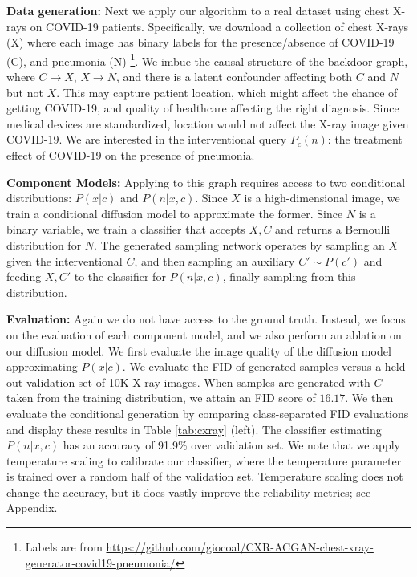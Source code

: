 \documentclass{article}
\newcommand{\idgen}{\text{ID-GEN}\xspace}
\theoremstyle{plain}
\theoremstyle{definition}
\theoremstyle{remark}
\begin{document}
	\textbf{Data generation:} Next we apply our algorithm to a real dataset using chest X-rays on COVID-19 patients. Specifically, we download a collection of chest X-rays (X) where each image has binary labels for the presence/absence of COVID-19 (C), and pneumonia (N) \citep{Wang2020covid} \footnote{Labels are from \href{https://github.com/giocoal/CXR-ACGAN-chest-xray-generator-covid19-pneumonia/}{https://github.com/giocoal/CXR-ACGAN-chest-xray-generator-covid19-pneumonia/}}. We imbue the causal structure of the backdoor graph, where $C\to X$, $X\to N$, and there is a latent confounder affecting both $C$ and $N$ but not $X$. This may capture patient location, which might affect the chance of getting COVID-19, and quality of healthcare affecting the right diagnosis. %
	Since medical devices are standardized, location would not affect the X-ray image given COVID-19. We are interested in the interventional query $P_c(n)$: the treatment effect of COVID-19 on the presence of pneumonia.
	
	\textbf{Component Models:} Applying \idgen to this graph requires access to two conditional distributions: $P(x|c)$ and $P(n|x,c)$. Since $X$ is a high-dimensional image, we train a conditional diffusion model to approximate the former. Since $N$ is a binary variable, we train a classifier that accepts $X, C$ and returns a Bernoulli distribution for $N$. The generated sampling network operates by sampling an $X$ given the interventional $C$, and then sampling an auxiliary $C'\sim P(c')$ and feeding $X, C'$ to the classifier for $P(n|x,c)$, finally sampling from this distribution. 
	
	
	
	\textbf{Evaluation:}
	Again we do not have access to the ground truth. Instead, we focus %
	on the evaluation of each component model, and we also perform an ablation on our diffusion model. We first evaluate the image quality of the diffusion model approximating $P(x|c)$. We evaluate the FID of generated samples versus a held-out validation set of 10K X-ray images. When samples are generated with $C$ taken from the %
	training distribution, we attain an FID score of $16.17$. We then evaluate the conditional generation by comparing class-separated FID evaluations and display these results in Table \ref{tab:cxray} (left). The classifier estimating $P(n|x,c)$ has an accuracy of 91.9\% over  validation set. We note that we apply temperature scaling \citep{guo2017calibration} to calibrate our classifier, where the temperature parameter is trained over a random half of the validation set. Temperature scaling does not change the accuracy, but it does vastly improve the reliability metrics; see Appendix. %
	
\end{document}
